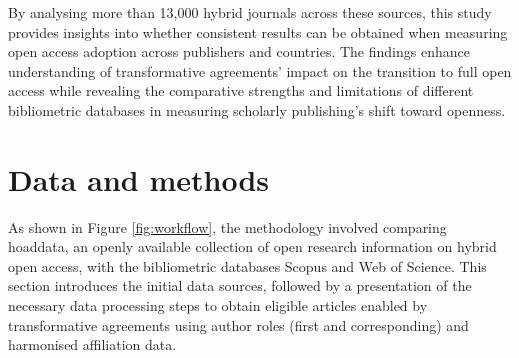 \documentclass[a4paper,man,floatsintext,longtable,noextraspace,10pt]{apa6}
\begin{document}
By analysing more than 13,000 hybrid journals across these sources, this
study provides insights into whether consistent results can be obtained
when measuring open access adoption across publishers and countries. The
findings enhance understanding of transformative agreements' impact on
the transition to full open access while revealing the comparative
strengths and limitations of different bibliometric databases in
measuring scholarly publishing's shift toward openness.

\section{Data and methods}\label{data-and-methods}

As shown in Figure \ref{fig:workflow}, the methodology involved
comparing hoaddata, an openly available collection of open research
information on hybrid open access, with the bibliometric databases
Scopus and Web of Science. This section introduces the initial data
sources, followed by a presentation of the necessary data processing
steps to obtain eligible articles enabled by transformative agreements
using author roles (first and corresponding) and harmonised affiliation
data.
\end{document}
